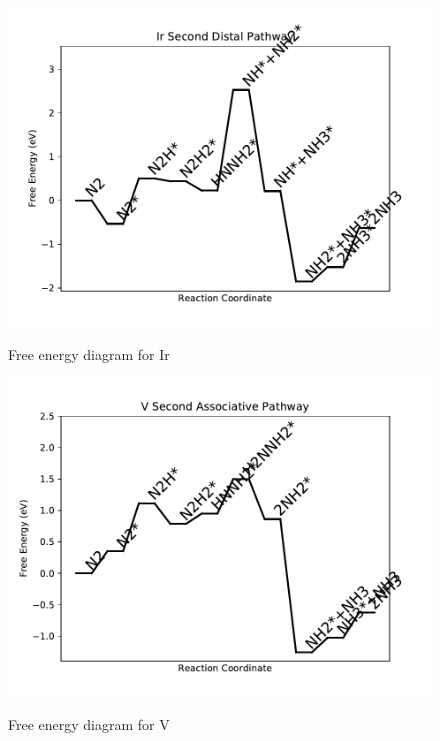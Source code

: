 \documentclass{article}
\begin{document}
\begin{figure}
\includegraphics[width=1\linewidth]{data/plots/Ir_distal_2.pdf}
\label{fig:Ir_distal_2}
\caption{Free energy diagram for Ir}
\end{figure}

\begin{figure}
\includegraphics[width=1\linewidth]{data/plots/V_associative_2.pdf}
\label{fig:V_associative_2}
\caption{Free energy diagram for V}
\end{figure}
\end{document}
